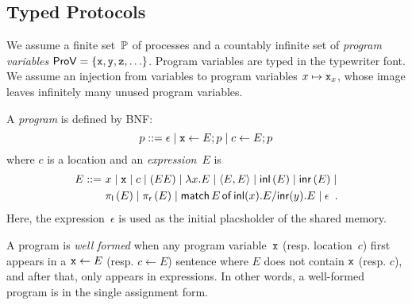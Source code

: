\subsection{Typed Protocols}

We assume a finite set~$\mathbb{P}$
of processes and a countably infinite
set of \textit{program variables}
$\mathsf{ProV} =\{\texttt{x}, \texttt{y}, \texttt{z}, \ldots\}$.
Program variables are typed in the typewriter font.
We assume an injection from variables to program variables $x\mapsto
\texttt{x}_x$, whose image leaves infinitely many unused program variables.

A \textit{program} is defined by BNF:
\[
 p ::= \epsilon\mid
 \texttt{x}\leftarrow E; p \mid
 c \leftarrow E; p
\]
where $c$ is a location and an \textit{expression}~$E$ is
\begin{align*}
 E
 ::=\,\,
 &x\mid \texttt{x} \mid c \mid (EE)\mid \lambda
 x.E\mid \langle{E,E}\rangle\mid \mathsf{inl}\left({E}\right)\mid \mathsf{inr}\left({E}\right)\mid \\
 &\pi_{\mathsf l}\left({E}\right)\mid\pi_{\mathsf r}\left({E}\right)\mid  \mathsf{match}\,{E}\,\mathsf{of}\, \mathsf{inl}({x}). {E}/ \mathsf{inr}({y}). {E}\mid \epsilon\enspace.
\end{align*}
Here, the expression~$\epsilon$ is used as the initial placsholder of the shared
memory.

\newcommand{\Wg}{W_{\mathrm g}}
\newcommand{\Wd}{W_{\mathrm d}}
A program is \textit{well formed} when
any program variable~$\texttt{x}$ (resp. location~$c$) first appears in a $\texttt{x}\leftarrow E$
(resp. $c\leftarrow E$)
sentence where $E$ does not contain $\texttt{x}$ (resp. $c$), and
after that, only appears in expressions.
In other words, a well-formed program is in the single assignment form.

